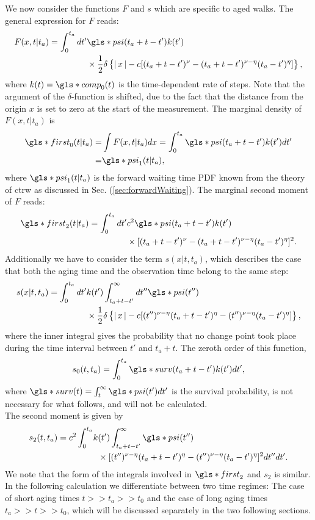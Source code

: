 We now consider the functions $F$ and $s$ which are specific to aged walks. The general expression for $F$ reads: 
\begin{align}
 F(x,t|t_a)= \int_0^{t_a} dt' & \gls*{psi}(t_a+t-t') k(t') \\
& \times \frac{1}{2}\delta \left\{\abs{x}
-c[(t_a+t-t')^\nu-(t_a+t-t')^{\nu-\eta} (t_a-t')^\eta]\right\} , \nonumber
\end{align}
where $k(t)=\gls*{comp}_{0}(t)$ is the time-dependent rate of steps. Note that the argument of the $\delta$-function is shifted, 
due to the fact that the distance from the origin $x$ is set to zero at the start of the measurement. The marginal density of $F(x,t|t_a)$ is
\begin{align}
\gls*{first}_0(t|t_a) =& \int F(x,t|t_a) dx =\int_0^{t_a} \gls*{psi}(t_a+t-t') k(t') dt' \nonumber \\
 =& \gls*{psi}_1(t|t_a),
\end{align}
where $\gls*{psi}_1(t|t_a)$ is the forward waiting time PDF known from the theory of \gls*{ctrw} as discussed in Sec. (\ref{sec:forwardWaiting}). The marginal second moment of $F$ reads:
\begin{align}
\gls*{first}_2(t|t_a) = \int_0^{t_a} dt' & c^2 \gls*{psi}(t_a+t-t') k(t')  \label{eqn:F2} \\ 
& \times [(t_a+t-t')^\nu-(t_a+t-t')^{\nu-\eta} (t_a-t')^\eta]^2 . \nonumber
\end{align}
Additionally we have to consider the term $s(x|t,t_a)$, which describes the case that both the aging time and the observation time belong to the same step:
\begin{align}
 s(x|t,t_a) = \int_0^{t_a} dt' & k(t') \int^{\infty}_{t_a+t-t'} dt'' \gls*{psi}(t'')  \\
& \times \frac{1}{2} \delta \left\{\abs{x}-c[(t'')^{\nu-\eta}(t_a+t-t')^\eta-(t'')^{\nu-\eta}(t_a-t')^{\eta}]\right\} , \nonumber 
\end{align}
where the inner integral gives the probability that no change point took place during the time interval between $t'$ and $t_a+t$. The zeroth order of this function,
\begin{equation}
 s_0(t,t_a) = \int_0^{t_a} \gls*{surv}(t_a+t-t') k(t') dt'  ,
\end{equation}
where $\gls*{surv}(t) = \int_t^\infty \gls*{psi}(t') dt'$ is the survival probability,
is not necessary for what follows, and will not be calculated. \\
The second moment is given by
\begin{align}
\begin{split}
 s_2(t,t_a) =c^2 \int_0^{t_a} & k(t') \int^{\infty}_{t_a+t-t'}  \gls*{psi}(t'')  \\ 
& \;\; \times [(t'')^{\nu-\eta}(t_a+t-t')^\eta-(t'')^{\nu-\eta}(t_a-t')^{\eta}]^2   dt'' dt'  \label{eqn:s2} .
\end{split}
\end{align}
We note that the form of the integrals involved in $\gls*{first}_2$ and $s_2$ is  similar. 
In the following calculation we differentiate between two time regimes: The case of short aging times $t>>t_a>> t_0$ and the case of long aging times $t_a>>t>>t_0$, 
which will be discussed separately in the two following sections. 

